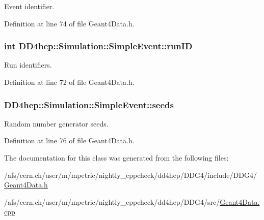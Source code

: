 Event identifier. 

Definition at line 74 of file Geant4Data.h.\hypertarget{class_d_d4hep_1_1_simulation_1_1_simple_event_a128035e74755e19ac0fc4526e959a96c}{
\subsubsection[{runID}]{\setlength{\rightskip}{0pt plus 5cm}int {\bf DD4hep::Simulation::SimpleEvent::runID}}}
\label{class_d_d4hep_1_1_simulation_1_1_simple_event_a128035e74755e19ac0fc4526e959a96c}


Run identifiers. 

Definition at line 72 of file Geant4Data.h.\hypertarget{class_d_d4hep_1_1_simulation_1_1_simple_event_a6284fef7dbe512536fad17533444e325}{
\subsubsection[{seeds}]{ {\bf DD4hep::Simulation::SimpleEvent::seeds}}}
\label{class_d_d4hep_1_1_simulation_1_1_simple_event_a6284fef7dbe512536fad17533444e325}


Random number generator seeds. 

Definition at line 76 of file Geant4Data.h.

The documentation for this class was generated from the following files:\begin{DoxyCompactItemize}
\item 
/afs/cern.ch/user/m/mpetric/nightly\_\-cppcheck/dd4hep/DDG4/include/DDG4/\hyperlink{_geant4_data_8h}{Geant4Data.h}\item 
/afs/cern.ch/user/m/mpetric/nightly\_\-cppcheck/dd4hep/DDG4/src/\hyperlink{_geant4_data_8cpp}{Geant4Data.cpp}\end{DoxyCompactItemize}
